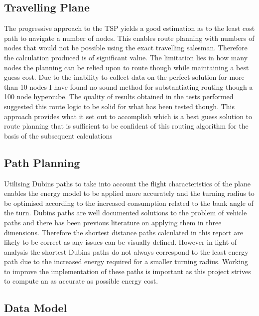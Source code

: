 \documentclass[a4paper,12pt,twoside]{article}
\begin{document}
\subsection{Travelling Plane}
\label{sec:travelling_plane}

The progressive approach to the TSP yields a good estimation as to the least cost path to navigate a number of nodes. This enables route planning with numbers of nodes that would not be possible using the exact travelling salesman. Therefore the calculation produced is of significant value. The limitation lies in how many nodes the planning can be relied upon to route though while maintaining a best guess cost. Due to the inability to collect data on the perfect solution for more than 10 nodes I have found no sound method for substantiating routing though a 100 node hypercube. The quality of results obtained in the tests performed suggested this route logic to be solid for what has been tested though. This approach provides what it set out to accomplish which is a best guess solution to route planning that is sufficient to be confident of this routing algorithm for the basis of the subsequent calculations

\subsection{Path Planning}
\label{sec:path_planning_1}

Utilising Dubins paths to take into account the flight characteristics of the plane enables the energy model to be applied more accurately and the turning radius to be optimised according to the increased consumption related to the bank angle of the turn. Dubins paths are well documented solutions to the problem of vehicle paths and there has been previous literature on applying them in three dimensions. Therefore the shortest distance paths calculated in this report are likely to be correct as any issues can be visually defined. However in light of analysis the shortest Dubins paths do not always correspond to the least energy path due to the increased energy required for a smaller turning radius. Working to improve the implementation of these paths is important as this project strives to compute an as accurate as possible energy cost.

\subsection{Data Model}
\label{sec:data_model}
\end{document}
